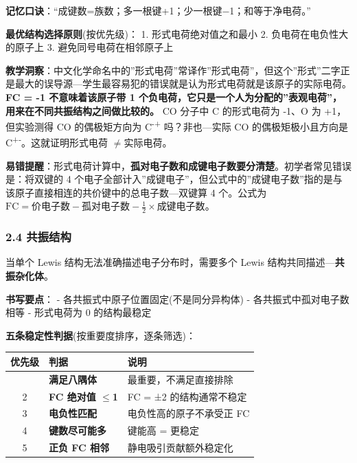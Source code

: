 \documentclass[a4paper,11pt]{ctexart}
\newcounter{none}
\newcommand{\箭}{\ensuremath{\rightarrow}}
\newcommand{\左箭}{\ensuremath{\leftarrow}}
\newcommand{\上箭}{\ensuremath{\uparrow}}
\newcommand{\下箭}{\ensuremath{\downarrow}}
\newcommand{\衡}{\ensuremath{\rightleftharpoons}}
\newcommand{\双箭}{\ensuremath{\leftrightarrow}}
\newcommand{\约等于}{\ensuremath{\approx}}
\newcommand{\小于等于}{\ensuremath{\leq}}
\newcommand{\大于等于}{\ensuremath{\geq}}
\newcommand{\不等于}{\ensuremath{\neq}}
\newcommand{\西格马}{\ensuremath{\sigma}}
\newcommand{\派}{\ensuremath{\pi}}
\begin{document}
\textbf{记忆口诀}：``成键数=族数；多一根键+1；少一根键−1；和等于净电荷。''

\textbf{最优结构选择原则}(按优先级)：
1. 形式电荷绝对值之和最小
2. 负电荷在电负性大的原子上
3. 避免同号电荷在相邻原子上

\textbf{教学洞察}：中文化学命名中的''形式电荷''常译作''形式电荷''，但这个''形式''二字正是最大的误导源---学生最容易犯的错误就是认为形式电荷就是该原子的实际电荷。\textbf{FC = -1 不意味着该原子带 1 个负电荷，它只是一个人为分配的''表观电荷''，用来在不同共振结构之间做比较的。} CO 分子中 C 的形式电荷为 -1、O 为 +1，但实验测得 CO 的偶极矩方向为 C\textsuperscript{-}\textsuperscript{+} 吗？非也---实际 CO 的偶极矩极小且方向是 C\textsuperscript{+}\textsuperscript{-}。这就证明形式电荷 \不等于 实际电荷。

\textbf{易错提醒}：形式电荷计算中，\textbf{孤对电子数和成键电子数要分清楚}。初学者常见错误是：将双键的 4 个电子全部计入''成键电子''，但公式中的''成键电子数''指的是与该原子直接相连的共价键中的总电子数---双键算 4 个。公式为 \(\text{FC} = \text{价电子数} - \text{孤对电子数} - \frac{1}{2} \times \text{成键电子数}\)。

\subsubsection{2.4 共振结构}\label{ux5171ux632fux7ed3ux6784}

当单个 Lewis 结构无法准确描述电子分布时，需要多个 Lewis 结构共同描述---\textbf{共振杂化体}。

\textbf{书写要点}：
- 各共振式中原子位置固定(不是同分异构体)
- 各共振式中孤对电子数相等
- 形式电荷为 0 的结构最稳定

\textbf{五条稳定性判据}(按重要度排序，逐条筛选)：

{\def\LTcaptype{none} %
\begin{longtable}[]{@{}cll@{}}
\toprule\noalign{}
优先级 & 判据 & 说明 \\
\midrule\noalign{}
\endhead
\bottomrule\noalign{}
\endlastfoot
1 & \textbf{满足八隅体} & 最重要，不满足直接排除 \\
2 & \textbf{FC 绝对值 \小于等于 1} & FC = ±2 的结构通常不稳定 \\
3 & \textbf{电负性匹配} & 电负性高的原子不承受正 FC \\
4 & \textbf{键数尽可能多} & 键能高 = 更稳定 \\
5 & \textbf{正负 FC 相邻} & 静电吸引贡献额外稳定化 \\
\end{longtable}
}
\end{document}
